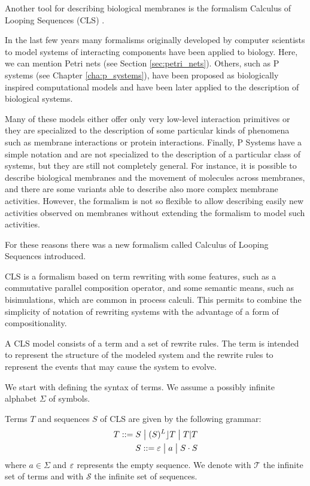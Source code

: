 Another tool for describing biological membranes is the formalism Calculus of Looping Sequences (CLS) \cite{Barbuti07CLS}.

In the last few years many formalisms originally developed by computer scientists to model systems of interacting components have been applied to biology. Here, we can mention Petri nets (see Section \ref{sec:petri_nets}). Others, such as P systems (see Chapter \ref{cha:p_systems}), have been proposed as biologically inspired computational models and have been later applied to the description of biological systems.

Many of these models either offer only very low-level interaction primitives or they are specialized to the description of some particular kinds of phenomena such as membrane interactions or protein interactions. Finally, P Systems have a simple notation and are not specialized to the description of a particular class of systems, but they are still not completely general. For instance, it is possible to describe biological membranes and the movement of molecules across membranes, and there are some variants able to describe also more complex membrane activities. However, the formalism is not so flexible to allow describing easily new activities observed on membranes without extending the formalism to model such activities.

For these reasons there was a new formalism called Calculus of Looping Sequences introduced.

CLS is a formalism based on term rewriting with some features, such as a commutative parallel composition operator, and some semantic means, such as bisimulations, which are common in process calculi. This permits to combine the simplicity of notation of rewriting systems with the advantage of a form of compositionality.

A CLS model consists of a term and a set of rewrite rules. The term is intended to represent the structure of the modeled system and the rewrite rules to represent the events that may cause the system to evolve.

We start with defining the syntax of terms. We assume a possibly infinite alphabet $\Sigma$ of symbols.

\begin{definition}
  Terms $T$ and sequences $S$ of CLS are given by the following grammar:
  \begin{align*}
    T ::= S \;\big|\; (S)^L\rfloor T \;\big|\; T|T\\
    S ::= \varepsilon \;\big|\; a \;\big|\; S\cdot S
  \end{align*}
  where $a\in \Sigma$ and $\varepsilon$ represents the empty sequence. We denote with $\mathcal T$ the infinite set of terms and with $\mathcal S$ the infinite set of sequences.
\end{definition}

